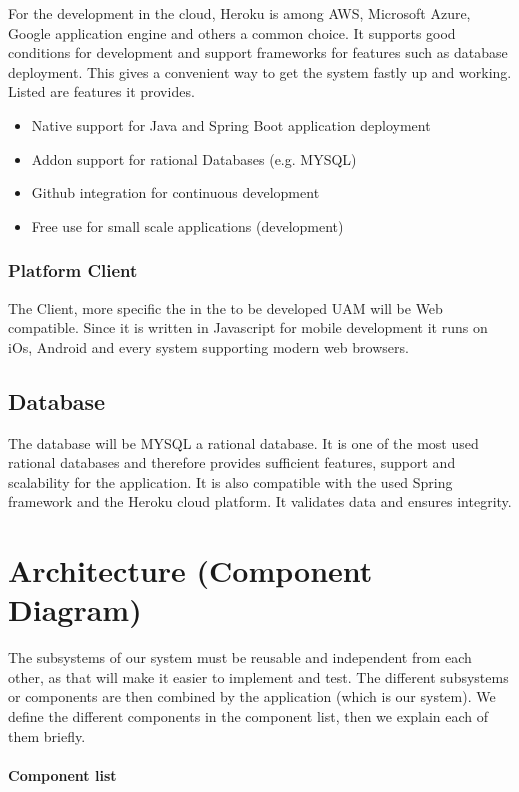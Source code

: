 \documentclass[a4paper,11pt]{article}
\begin{document}
For the development in the cloud, Heroku is among AWS, Microsoft Azure, Google application engine and others a common choice. It supports good conditions for development and support frameworks for features such as database deployment. This gives a convenient way to get the system fastly up and working. Listed are features it provides.
\begin{itemize}
\item Native support for Java and Spring Boot application deployment
\item Addon support for rational Databases (e.g. MYSQL)
\item Github integration for continuous development
\item Free use for small scale applications (development)
\end{itemize}

\subsubsection{Platform Client}
The Client, more specific the in the to be developed UAM will be Web compatible. Since it is written in Javascript for mobile development it runs on iOs, Android and every system supporting modern web browsers.

\subsection{Database}
The database will be MYSQL a rational database.
It is one of the most used rational databases and therefore provides sufficient features, support and scalability for the application. It is also compatible with the used Spring framework and the Heroku cloud platform. It validates data and ensures integrity.



\newpage
\section{Architecture (Component Diagram)} \label{Architecture}
The subsystems of our system must be reusable and independent from each
other, as that will make it easier to implement and test. The different
subsystems or components are then combined by the application (which is
our system). We define the different components in the component list,
then we explain each of them briefly.

\paragraph{Component list}\label{component-list}
\end{document}
